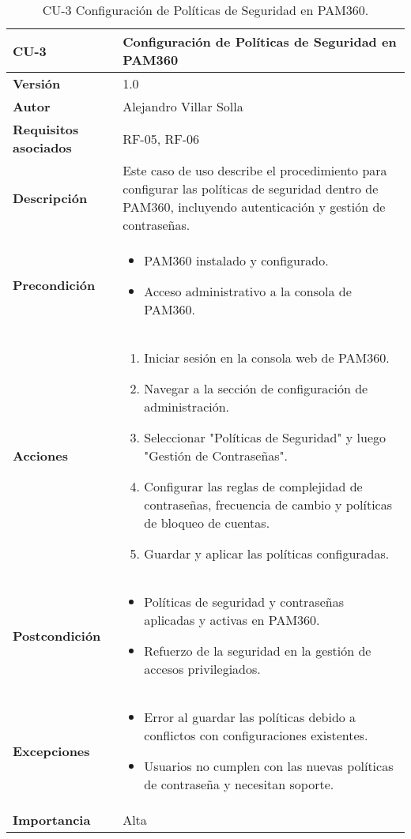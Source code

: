\begin{table}[p]
	\centering
	\begin{tabularx}{\linewidth}{ p{} p{} }
		\toprule
		\textbf{CU-3}    & \textbf{Configuración de Políticas de Seguridad en PAM360}\\
		\toprule
		\textbf{Versión}              & 1.0    \\
		\textbf{Autor}                & Alejandro Villar Solla \\
		\textbf{Requisitos asociados} & RF-05, RF-06 \\
		\textbf{Descripción}          & Este caso de uso describe el procedimiento para configurar las políticas de seguridad dentro de PAM360, incluyendo autenticación y gestión de contraseñas. \\
		\textbf{Precondición}         & 
		\begin{itemize}
			\item PAM360 instalado y configurado.
			\item Acceso administrativo a la consola de PAM360.
		\end{itemize}\\
		\textbf{Acciones}             &
		\begin{enumerate}
			\item Iniciar sesión en la consola web de PAM360.
			\item Navegar a la sección de configuración de administración.
			\item Seleccionar "Políticas de Seguridad" y luego "Gestión de Contraseñas".
			\item Configurar las reglas de complejidad de contraseñas, frecuencia de cambio y políticas de bloqueo de cuentas.
			\item Guardar y aplicar las políticas configuradas.
		\end{enumerate}\\
		\textbf{Postcondición}        & 
		\begin{itemize}
			\item Políticas de seguridad y contraseñas aplicadas y activas en PAM360.
			\item Refuerzo de la seguridad en la gestión de accesos privilegiados.
		\end{itemize}\\
		\textbf{Excepciones}          & 
		\begin{itemize}
			\item Error al guardar las políticas debido a conflictos con configuraciones existentes.
			\item Usuarios no cumplen con las nuevas políticas de contraseña y necesitan soporte.
		\end{itemize}\\
		\textbf{Importancia}          & Alta \\
		\bottomrule
	\end{tabularx}
	\caption{CU-3 Configuración de Políticas de Seguridad en PAM360.}
\end{table}

